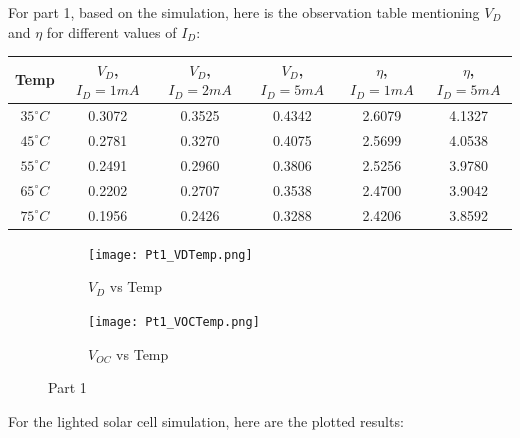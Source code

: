 \documentclass[12pt]{article}
\begin{document}
For part 1, based on the simulation, here is the observation table mentioning \(V_D\) and \(\eta\) for different values of \(I_D\):

\begin{center}
 \begin{tabular}{|| c | c | c | c | c | c ||} 
 \hline
 \hline
 Temp & \(V_D\), \(I_D = 1mA\) & \(V_D\), \(I_D = 2mA\) & \(V_D\), \(I_D = 5mA\) & \( \eta \), \(I_D = 1mA\) & \( \eta \), \( I_D = 5mA \) \\[0.25ex] 
 \hline\hline
 \(35^{\circ}C\) & 0.3072 & 0.3525 & 0.4342 & 2.6079 & 4.1327 \\
 \(45^{\circ}C\) & 0.2781 & 0.3270 & 0.4075 & 2.5699 & 4.0538 \\
 \(55^{\circ}C\) & 0.2491 & 0.2960 & 0.3806 & 2.5256 & 3.9780 \\
 \(65^{\circ}C\) & 0.2202 & 0.2707 & 0.3538 & 2.4700 & 3.9042 \\
 \(75^{\circ}C\) & 0.1956 & 0.2426 & 0.3288 & 2.4206 & 3.8592 \\
 \hline 

\end{tabular}
\end{center}

\begin{figure}[H]
	\begin{subfigure}[b]{0.6\linewidth}
	   	\texttt{[image: Pt1\_VDTemp.png]}
		\caption{\( V_D \) vs Temp }
	\end{subfigure}
	\begin{subfigure}[b]{0.6\linewidth}
		\texttt{[image: Pt1\_VOCTemp.png]}
		\caption{\( V_{OC} \) vs Temp}
	\end{subfigure} 
	\caption{Part 1}
\end{figure}

For the lighted solar cell simulation, here are the plotted results:
\end{document}
